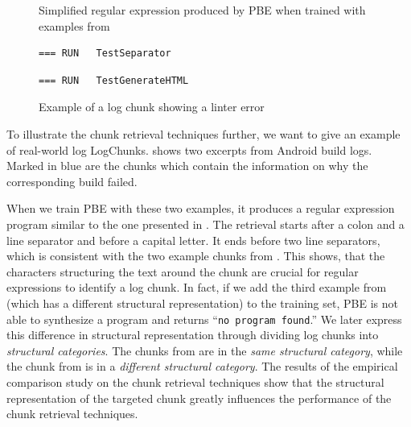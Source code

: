 \begin{figure}[tbp]
  \centering
  
  \caption{Simplified regular expression produced by PBE when trained
  with examples from }
  \label{lst:prose-program-simplified}
\end{figure}

\begin{figure}[tbp]
  \centering
  \begin{lstlisting}[breaklines=true,frame=tlr]
=== RUN   TestSeparator
  \end{lstlisting}
  \vspace{-\baselineskip}
  
  \vspace{-\baselineskip}
  \begin{lstlisting}[breaklines=true,frame=blr]
=== RUN   TestGenerateHTML
  \end{lstlisting}
  \caption{Example of a log chunk showing a linter error}
  \label{lst:chunk-example-3}
\end{figure}

To illustrate the chunk retrieval techniques further, we want to give
an example of real-world log LogChunks.
 shows two excerpts
from Android build logs.
Marked in blue are the chunks
which contain the information on why the
corresponding build failed.

When we train PBE with these two examples, it produces
a regular expression program similar to the one presented in
.
The retrieval
starts after a colon and a line separator and before a capital
letter.
It ends before two line separators,
which is consistent with the two example
chunks from .
This shows, that the characters structuring the text around the chunk are
crucial for regular expressions to identify a log chunk.
In fact, if we add the third example from 
(which has a
different structural representation) to the training set,
PBE is not able to synthesize a program and returns
``\texttt{no program found}.''
We later express this difference in structural representation through
dividing log chunks into \emph{structural categories}.
The chunks from 
are in the \emph{same structural category}, while the chunk from
 is in a
\emph{different structural category}.
The results of the empirical comparison study on the chunk retrieval
techniques
show that the structural representation of the targeted chunk greatly
influences
the performance of the chunk retrieval techniques.

